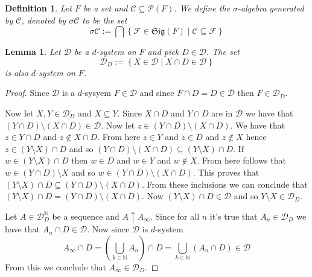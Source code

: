 \documentclass[a4paper]{amsart}
\newtheorem{deff}{Definition}
\newtheorem{lem}{Lemma}
\newcommand{\pow}[1]{\mathscr{P}\left(#1\right)}
\newcommand{\sig}[1]{\mathfrak{Sig}\left(#1\right)}
\newcommand{\NN}{\mathbb{N}}
\newcommand{\convg}{\uparrow}
\begin{document}
\begin{deff}
    Let $F$ be a set and $\mathcal{C} \subseteq \pow{F}$. We define the $\sigma$-algebra generated by $\mathcal{C}$, denoted by $\sigma\mathcal{C}$ to be the set
    $$
    \sigma\mathcal{C} := \bigcap\left\{ \mathcal{F} \in \sig{F} \mid \mathcal{C} \subseteq \mathcal{F} \right\}
    $$
\end{deff}

\begin{lem}
    Let $\mathcal{D}$ be a $d$-system on $F$ and pick $D \in \mathcal{D}$. The set 
    $$ \mathcal{D}_D := \left\{ X \in \mathcal{D} \mid X \cap D \in \mathcal{D} \right\} $$
    is also $d$-system on $F$.
\end{lem}

\begin{proof}
    Since $\mathcal{D}$ is a $d$-sysyem 
    $F \in \mathcal{D}$ and since $F \cap D = D \in \mathcal{D}$ 
    then $F \in \mathcal{D}_D$. 
    
    Now let $X,Y \in \mathcal{D}_D$ and $X \subseteq Y$.
    Since $X \cap D$ and $Y \cap D$ are in $\mathcal{D}$ we have that 
    $ \left(Y \cap D\right) \setminus \left(X \cap D\right) \in \mathcal{D}$. 
    Now let $z \in  \left(Y \cap D\right) \setminus \left(X \cap D\right)$. 
    We have that $z \in Y \cap D$ and $z \notin X \cap D$. 
    From here $z \in Y$ and $z \in D$ and $z \notin X$ hence $z \in \left(Y \setminus X\right) \cap D$ and so
    $
    \left(Y\cap D\right) \setminus \left(X\cap D\right) \subseteq  \left(Y \setminus X\right) \cap D
    $. If $w \in \left(Y \setminus X\right) \cap D $ then 
    $w \in D$ and $w \in Y$ and $w \notin X$. From here follows that $w \in \left(Y \cap D\right) \setminus X$
    and so $w  \in \left(Y \cap D\right) \setminus \left(X \cap D \right)$.
    This proves that $ \left(Y \setminus X\right) \cap D  \subseteq\left(Y \cap D\right) \setminus \left(X \cap D \right)$.
    From these inclusions we can conclude that 
    $\left(Y \setminus X\right) \cap D  = \left(Y \cap D\right) \setminus \left(X \cap D \right)$.
    Now $\left(Y \setminus X\right) \cap D  \in \mathcal{D}$ and so $Y \setminus X \in \mathcal{D}_D$.
    
    Let $A \in \mathcal{D}_D^\NN$ be a sequence and $A \convg A_\infty$.
    Since for all $n$ it's true that $A_n \in \mathcal{D}_D$ we have that $A_n \cap D \in \mathcal{D}$.
    Now since $\mathcal{D}$ is $d$-system 
    $$ A_\infty \cap D = \left(\bigcup\limits_{k \in \NN} A_n\right) \cap D = \bigcup\limits_{k \in \NN} \left(A_n \cap D\right) \in \mathcal{D}$$
    From this we conclude that $A_\infty \in \mathcal{D}_D$.
\end{proof}
\end{document}
